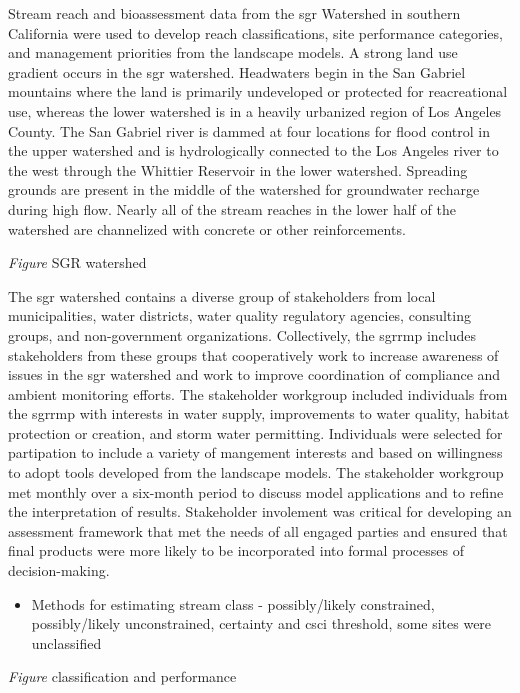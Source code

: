 \documentclass[]{article}
\providecommand{\tightlist}{%
  \setlength{\itemsep}{0pt}\setlength{\parskip}{0pt}}
\begin{document}
Stream reach and bioassessment data from the \ac{sgr} Watershed in
southern California were used to develop reach classifications, site
performance categories, and management priorities from the landscape
models. A strong land use gradient occurs in the \ac{sgr} watershed.
Headwaters begin in the San Gabriel mountains where the land is
primarily undeveloped or protected for reacreational use, whereas the
lower watershed is in a heavily urbanized region of Los Angeles County.
The San Gabriel river is dammed at four locations for flood control in
the upper watershed and is hydrologically connected to the Los Angeles
river to the west through the Whittier Reservoir in the lower watershed.
Spreading grounds are present in the middle of the watershed for
groundwater recharge during high flow. Nearly all of the stream reaches
in the lower half of the watershed are channelized with concrete or
other reinforcements.

\emph{Figure} SGR watershed

The \ac{sgr} watershed contains a diverse group of stakeholders from
local municipalities, water districts, water quality regulatory
agencies, consulting groups, and non-government organizations.
Collectively, the \ac{sgrrmp} includes stakeholders from these groups
that cooperatively work to increase awareness of issues in the \ac{sgr}
watershed and work to improve coordination of compliance and ambient
monitoring efforts. The stakeholder workgroup included individuals from
the \ac{sgrrmp} with interests in water supply, improvements to water
quality, habitat protection or creation, and storm water permitting.
Individuals were selected for partipation to include a variety of
mangement interests and based on willingness to adopt tools developed
from the landscape models. The stakeholder workgroup met monthly over a
six-month period to discuss model applications and to refine the
interpretation of results. Stakeholder involement was critical for
developing an assessment framework that met the needs of all engaged
parties and ensured that final products were more likely to be
incorporated into formal processes of decision-making.

\begin{itemize}
\tightlist
\item
  Methods for estimating stream class - possibly/likely constrained,
  possibly/likely unconstrained, certainty and \ac{csci} threshold, some
  sites were unclassified
\end{itemize}

\emph{Figure} classification and performance
\end{document}
